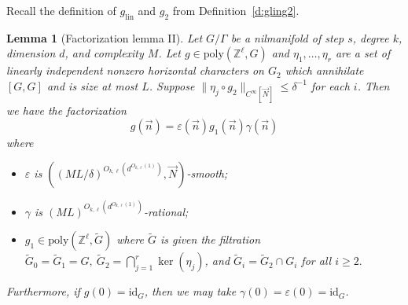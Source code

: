 \documentclass[11pt, a4paper]{amsart}
\theoremstyle{plain}
\theoremstyle{plain}
\newtheorem{lemma}{Lemma}
\theoremstyle{definition}
\theoremstyle{remark}
\numberwithin{equation}{section}
\numberwithin{lemma}{section}
\numberwithin{proposition}{section}
\numberwithin{corollary}{section}
\numberwithin{definition}{section}
\numberwithin{claim}{section}
\begin{document}
Recall the definition of $g_{\mathrm{lin}}$ and $g_2$ from Definition~\ref{d:gling2}.
\begin{lemma}[Factorization lemma II]\label{l:factorization2}
Let $G/\Gamma$ be a nilmanifold of step $s$, degree $k$, dimension $d$, and complexity $M$. Let $g \in \mathrm{poly}(\mathbb{Z}^\ell, G)$ and $\eta_1, \dots, \eta_r$ are a set of linearly independent nonzero horizontal characters on $G_2$ which annihilate $[G, G]$ and is size at most $L$. Suppose $\|\eta_j \circ g_2\|_{C^\infty[\vec{N}]} \le \delta^{-1}$ for each $i$. Then we have the factorization
$$g(\vec{n}) = \varepsilon(\vec{n})g_1(\vec{n})\gamma(\vec{n})$$
where
\begin{itemize}
    \item $\varepsilon$ is $((ML/\delta)^{O_{k, \ell}(d^{O_{k, \ell}(1)})}, \vec{N})$-smooth;
    \item $\gamma$ is $(ML)^{O_{k, \ell}(d^{O_{k, \ell}(1)})}$-rational;
    \item $g_1 \in \mathrm{poly}(\mathbb{Z}^\ell, \tilde{G})$ where $\tilde{G}$ is given the filtration
$\tilde{G}_0 = \tilde{G}_1 = G,~\tilde{G}_2 = \bigcap_{j = 1}^r \operatorname{ker}(\eta_j)$, and $\tilde{G}_i = \tilde{G}_2 \cap G_i$ for all $i \ge 2.$
\end{itemize}
Furthermore, if $g(0) = \mathrm{id}_G$, then we may take $\gamma(0) = \varepsilon(0) = \mathrm{id}_G$.
\end{lemma}
\end{document}
